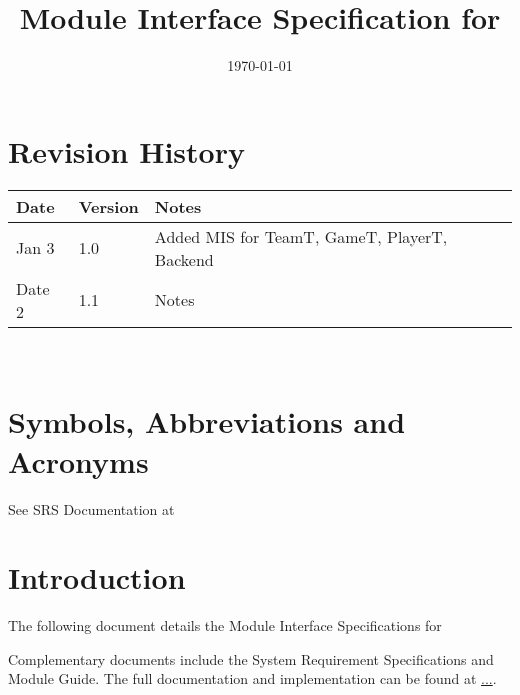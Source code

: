 \documentclass[12pt, titlepage]{article}
\begin{document}
\title{Module Interface Specification for \progname{}}

\author{\authname}

\date{\today}

\maketitle


\section{Revision History}

\begin{tabularx}{\textwidth}{p{3cm}p{2cm}X}
  \toprule {\bf Date} & {\bf Version} & {\bf Notes}                                  \\
  \midrule
  Jan 3               & 1.0           & Added MIS for TeamT, GameT, PlayerT, Backend \\
  Date 2              & 1.1           & Notes                                        \\
  \bottomrule
\end{tabularx}

~\newpage

\section{Symbols, Abbreviations and Acronyms}

See SRS Documentation at 


\newpage

\tableofcontents

\newpage


\section{Introduction}

The following document details the Module Interface Specifications for

Complementary documents include the System Requirement Specifications
and Module Guide.  The full documentation and implementation can be
found at \url{...}.  
\end{document}
